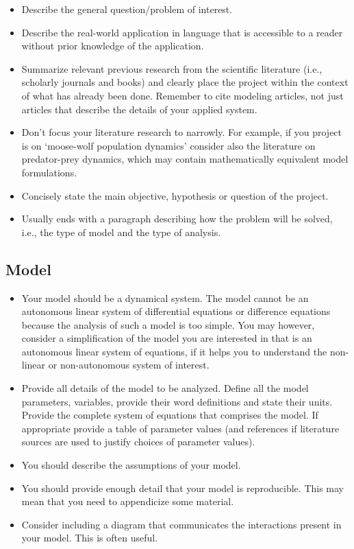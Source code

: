 \documentclass[]{book}
\providecommand{\tightlist}{%
  \setlength{\itemsep}{0pt}\setlength{\parskip}{0pt}}
\begin{document}
\begin{itemize}
\tightlist
\item
  Describe the general question/problem of interest.
\item
  Describe the real-world application in language that is accessible to
  a reader without prior knowledge of the application.
\item
  Summarize relevant previous research from the scientific literature
  (i.e., scholarly journals and books) and clearly place the project
  within the context of what has already been done. Remember to cite
  modeling articles, not just articles that describe the details of your
  applied system.
\item
  Don't focus your literature research to narrowly. For example, if you
  project is on `moose-wolf population dynamics' consider also the
  literature on predator-prey dynamics, which may contain mathematically
  equivalent model formulations.
\item
  Concisely state the main objective, hypothesis or question of the
  project.
\item
  Usually ends with a paragraph describing how the problem will be
  solved, i.e., the type of model and the type of analysis.
\end{itemize}

\subsection{Model}\label{model}

\begin{itemize}
\tightlist
\item
  Your model should be a dynamical system. The model cannot be an
  autonomous linear system of differential equations or difference
  equations because the analysis of such a model is too simple. You may
  however, consider a simplification of the model you are interested in
  that is an autonomous linear system of equations, if it helps you to
  understand the non-linear or non-autonomous system of interest.
\item
  Provide all details of the model to be analyzed. Define all the model
  parameters, variables, provide their word definitions and state their
  units. Provide the complete system of equations that comprises the
  model. If appropriate provide a table of parameter values (and
  references if literature sources are used to justify choices of
  parameter values).
\item
  You should describe the assumptions of your model.
\item
  You should provide enough detail that your model is reproducible. This
  may mean that you need to appendicize some material.
\item
  Consider including a diagram that communicates the interactions
  present in your model. This is often useful.
\end{itemize}
\end{document}
